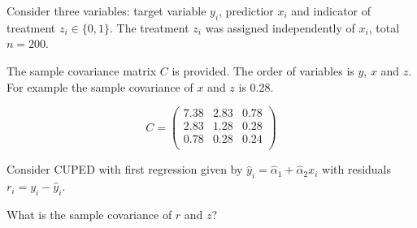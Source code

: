 
\begin{question}
Consider three variables: target variable \(y_i\), predictior \(x_i\) and indicator of treatment \(z_i \in \{0,1\}\).
The treatment \(z_i\) was assigned independently of \(x_i\), total \(n=200\).

The sample covariance matrix \(C\) is provided.
The order of variables is \(y\), \(x\) and \(z\).
For example the sample covariance of \(x\) and \(z\) is 0.28.

\[
C = \begin{pmatrix}
        7.38 & 2.83 & 0.78 \\
        2.83 & 1.28 & 0.28 \\
        0.78 & 0.28 & 0.24 \\
\end{pmatrix}    
\]

Consider CUPED with first regression given by \(\hat y_i = \hat\alpha_1 + \hat\alpha_2 x_i\) with residuals \(r_i = y_i - \hat y_i\).

What is the sample covariance of \(r\) and \(z\)?
\end{question}


